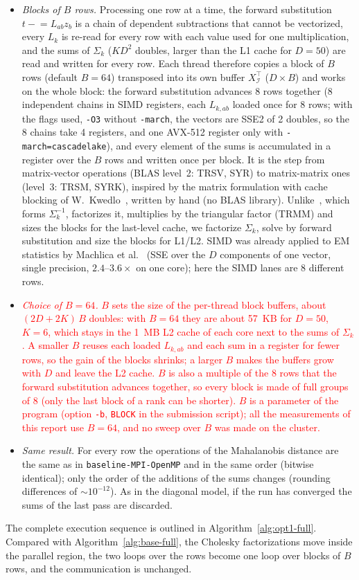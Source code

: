 \documentclass[conference,onecolumn]{IEEEtran}
\newcommand{\vbase}{\texttt{baseline-\allowbreak MPI-\allowbreak OpenMP}}
\begin{document}
\begin{itemize}
\item \emph{Blocks of $B$ rows.} Processing one row at a time, the forward substitution $t\mathrel{-}=L_{ab}z_b$ is a chain of dependent subtractions that cannot be vectorized, every $L_k$ is re-read for every row with each value used for one multiplication, and the sums of $\Sigma_k$ ($KD^2$ doubles, larger than the L1 cache for $D=50$) are read and written for every row. Each thread therefore copies a block of $B$ rows (default $B=64$) transposed into its own buffer $X^\top_{\mathcal{I}}$ ($D\times B$) and works on the whole block: the forward substitution advances $8$ rows together (8 independent chains in SIMD registers, each $L_{k,ab}$ loaded once for 8 rows; with the flags used, \texttt{-O3} without \texttt{-march}, the vectors are SSE2 of 2 doubles, so the 8 chains take 4 registers, and one AVX-512 register only with \texttt{-march=cascadelake}), and every element of the sums is accumulated in a register over the $B$ rows and written once per block. It is the step from matrix-vector operations (BLAS level~2: TRSV, SYR) to matrix-matrix ones (level~3: TRSM, SYRK), inspired by the matrix formulation with cache blocking of W.~Kwedlo~\cite{kwedlo}, written by hand (no BLAS library). Unlike~\cite{kwedlo}, which forms $\Sigma_k^{-1}$, factorizes it, multiplies by the triangular factor (TRMM) and sizes the blocks for the last-level cache, we factorize $\Sigma_k$, solve by forward substitution and size the blocks for L1/L2. SIMD was already applied to EM statistics by Machlica et al.~\cite[Sec.~IV]{machlica} (SSE over the $D$ components of one vector, single precision, $2.4$--$3.6\times$ on one core); here the SIMD lanes are 8 different rows.
\item \textcolor{red}{\emph{Choice of $B=64$.} $B$ sets the size of the per-thread block buffers, about $(2D+2K)\,B$ doubles: with $B=64$ they are about 57~KB for $D=50$, $K=6$, which stays in the 1~MB L2 cache of each core next to the sums of $\Sigma_k$. A smaller $B$ reuses each loaded $L_{k,ab}$ and each sum in a register for fewer rows, so the gain of the blocks shrinks; a larger $B$ makes the buffers grow with $D$ and leave the L2 cache. $B$ is also a multiple of the 8 rows that the forward substitution advances together, so every block is made of full groups of 8 (only the last block of a rank can be shorter). $B$ is a parameter of the program (option \texttt{-b}, \texttt{BLOCK} in the submission script); all the measurements of this report use $B=64$, and no sweep over $B$ was made on the cluster.}
\item \emph{Same result.} For every row the operations of the Mahalanobis distance are the same as in \vbase{} and in the same order (bitwise identical); only the order of the additions of the sums changes (rounding differences of $\sim10^{-12}$). As in the diagonal model, if the run has converged the sums of the last pass are discarded.
\end{itemize}
The complete execution sequence is outlined in Algorithm~\ref{alg:opt1-full}. Compared with Algorithm~\ref{alg:base-full}, the Cholesky factorizations move inside the parallel region, the two loops over the rows become one loop over blocks of $B$ rows, and the communication is unchanged.
\end{document}
